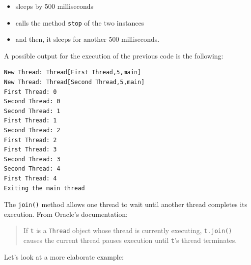 \documentclass{latex/classes/thesis}
\begin{document}
\begin{itemize}
\item sleeps by 500 milliseconds
\item calls the method \texttt{stop} of the two instances
\item and then, it sleeps for another 500 milliseconds.
\end{itemize}

A possible output for the execution of the previous code is the following:

\begin{verbatim}
New Thread: Thread[First Thread,5,main]
New Thread: Thread[Second Thread,5,main]
First Thread: 0
Second Thread: 0
Second Thread: 1
First Thread: 1
Second Thread: 2
First Thread: 2
First Thread: 3
Second Thread: 3
Second Thread: 4
First Thread: 4
Exiting the main thread
\end{verbatim}

The \texttt{join()} method allows one thread to wait until another thread completes
its execution. From Oracle's documentation:

\begin{quote}
If \texttt{t} is a \texttt{Thread} object whose thread is currently executing, \texttt{t.join()}
causes the current thread pauses execution until \texttt{t}'s thread terminates.
\end{quote}

Let's look at a more elaborate example:
\end{document}
